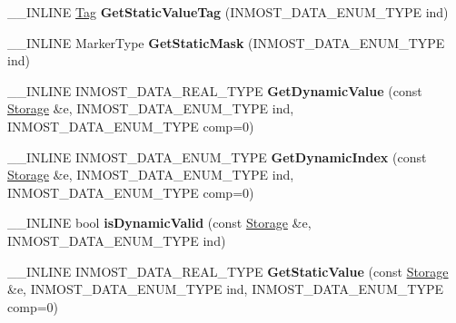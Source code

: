 \begin{DoxyCompactItemize}
\item 
\hypertarget{classINMOST_1_1Automatizator_a598fce631c693d1350b79b3da59a2303}{\-\_\-\-\_\-\-I\-N\-L\-I\-N\-E \hyperlink{classINMOST_1_1Tag}{Tag} {\bfseries Get\-Static\-Value\-Tag} (I\-N\-M\-O\-S\-T\-\_\-\-D\-A\-T\-A\-\_\-\-E\-N\-U\-M\-\_\-\-T\-Y\-P\-E ind)}\label{classINMOST_1_1Automatizator_a598fce631c693d1350b79b3da59a2303}

\item 
\hypertarget{classINMOST_1_1Automatizator_a06a1bb3d3a85545bc2d896500967c446}{\-\_\-\-\_\-\-I\-N\-L\-I\-N\-E Marker\-Type {\bfseries Get\-Static\-Mask} (I\-N\-M\-O\-S\-T\-\_\-\-D\-A\-T\-A\-\_\-\-E\-N\-U\-M\-\_\-\-T\-Y\-P\-E ind)}\label{classINMOST_1_1Automatizator_a06a1bb3d3a85545bc2d896500967c446}

\item 
\hypertarget{classINMOST_1_1Automatizator_ab41dc204fbb52720b8dbb365f40ee0f3}{\-\_\-\-\_\-\-I\-N\-L\-I\-N\-E I\-N\-M\-O\-S\-T\-\_\-\-D\-A\-T\-A\-\_\-\-R\-E\-A\-L\-\_\-\-T\-Y\-P\-E {\bfseries Get\-Dynamic\-Value} (const \hyperlink{classINMOST_1_1Storage}{Storage} \&e, I\-N\-M\-O\-S\-T\-\_\-\-D\-A\-T\-A\-\_\-\-E\-N\-U\-M\-\_\-\-T\-Y\-P\-E ind, I\-N\-M\-O\-S\-T\-\_\-\-D\-A\-T\-A\-\_\-\-E\-N\-U\-M\-\_\-\-T\-Y\-P\-E comp=0)}\label{classINMOST_1_1Automatizator_ab41dc204fbb52720b8dbb365f40ee0f3}

\item 
\hypertarget{classINMOST_1_1Automatizator_a3b9418a007184a35890a508d92fdb61c}{\-\_\-\-\_\-\-I\-N\-L\-I\-N\-E I\-N\-M\-O\-S\-T\-\_\-\-D\-A\-T\-A\-\_\-\-E\-N\-U\-M\-\_\-\-T\-Y\-P\-E {\bfseries Get\-Dynamic\-Index} (const \hyperlink{classINMOST_1_1Storage}{Storage} \&e, I\-N\-M\-O\-S\-T\-\_\-\-D\-A\-T\-A\-\_\-\-E\-N\-U\-M\-\_\-\-T\-Y\-P\-E ind, I\-N\-M\-O\-S\-T\-\_\-\-D\-A\-T\-A\-\_\-\-E\-N\-U\-M\-\_\-\-T\-Y\-P\-E comp=0)}\label{classINMOST_1_1Automatizator_a3b9418a007184a35890a508d92fdb61c}

\item 
\hypertarget{classINMOST_1_1Automatizator_a3da0c47982b82640337e87375abe7314}{\-\_\-\-\_\-\-I\-N\-L\-I\-N\-E bool {\bfseries is\-Dynamic\-Valid} (const \hyperlink{classINMOST_1_1Storage}{Storage} \&e, I\-N\-M\-O\-S\-T\-\_\-\-D\-A\-T\-A\-\_\-\-E\-N\-U\-M\-\_\-\-T\-Y\-P\-E ind)}\label{classINMOST_1_1Automatizator_a3da0c47982b82640337e87375abe7314}

\item 
\hypertarget{classINMOST_1_1Automatizator_a8d32c48035f0a83bd0ef783132d5da7a}{\-\_\-\-\_\-\-I\-N\-L\-I\-N\-E I\-N\-M\-O\-S\-T\-\_\-\-D\-A\-T\-A\-\_\-\-R\-E\-A\-L\-\_\-\-T\-Y\-P\-E {\bfseries Get\-Static\-Value} (const \hyperlink{classINMOST_1_1Storage}{Storage} \&e, I\-N\-M\-O\-S\-T\-\_\-\-D\-A\-T\-A\-\_\-\-E\-N\-U\-M\-\_\-\-T\-Y\-P\-E ind, I\-N\-M\-O\-S\-T\-\_\-\-D\-A\-T\-A\-\_\-\-E\-N\-U\-M\-\_\-\-T\-Y\-P\-E comp=0)}\label{classINMOST_1_1Automatizator_a8d32c48035f0a83bd0ef783132d5da7a}


\end{DoxyCompactItemize}
